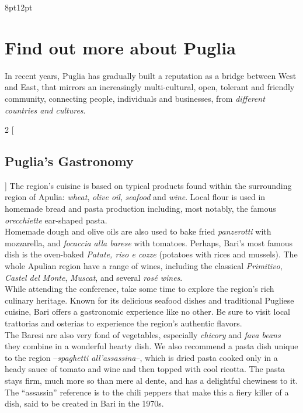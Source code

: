 \documentclass[
	openany, %
	parskip=full, %
	12pt, %
	a4paper, %
]{conferencebooklet} %
\begin{document}
\newpage
\begin{adjustwidth}{8pt}{12pt}
\section{Find out more about Puglia}
In recent years, Puglia has gradually built a reputation as a bridge between West and East, that mirrors an increasingly multi-cultural, open, tolerant and friendly community, connecting people, individuals and businesses, from \textit{different countries and cultures}.


\vspace{-5mm}
\begin{multicols}{2}
[\subsection*{Puglia’s Gastronomy}]
The region’s cuisine is based on typical products found within the surrounding region of Apulia: \textit{wheat}, \textit{olive oil}, \textit{seafood} and \textit{wine}. Local flour is used in homemade bread and pasta production including, most notably, the famous \textit{orecchiette} ear-shaped pasta. \\
Homemade dough and olive oils are also used to bake fried \textit{panzerotti} with mozzarella, and \textit{focaccia alla barese} with tomatoes. Perhaps, Bari’s most famous dish is the oven-baked \textit{Patate, riso e cozze} (potatoes with rices and mussels). The whole Apulian region have a range of wines, including the classical \textit{Primitivo}, \textit{Castel del Monte}, \textit{Muscat}, and several \textit{rosé wines}. \\
While attending the conference, take some time to explore the region's rich culinary heritage. Known for its delicious seafood dishes and traditional Pugliese cuisine, Bari offers a gastronomic experience like no other. Be sure to visit local trattorias and osterias to experience the region's authentic flavors. \\
The Baresi are also very fond of vegetables, especially \textit{chicory} and \textit{fava beans} they combine in a wonderful hearty dish. We also recommend a pasta dish unique to the region --\textit{spaghetti all’assassina}--, which is dried pasta cooked only in a heady sauce of tomato and wine and then topped with cool ricotta. The pasta stays firm, much more so than mere al dente, and has a delightful chewiness to it. The “assassin” reference is to the chili peppers that make this a fiery killer of a dish, said to be created in Bari in the 1970s.
\end{multicols}


\end{adjustwidth}
\end{document}
